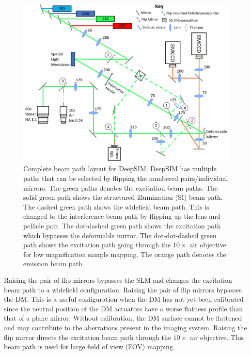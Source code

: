 \begin{figure}[h]
	\centering
	\includegraphics[width=\textwidth]{images/DeepSIM_complete_beam_paths.jpg}
	\caption{Complete beam path layout for DeepSIM. DeepSIM has multiple paths that can be selected by flipping the numbered pairs/individual mirrors. The green paths denotes the excitation beam paths. The solid green path shows the structured illumination (SI) beam path. The dashed green path shows the widefield beam path. This is changed to the interference beam path by flipping up the lens and pellicle pair. The dot-dashed green path shows the excitation path which bypasses the deformable mirror. The dot-dot-dashed green path shows the excitation path going through the $10\times$ air objective for low magnification sample mapping. The orange path denotes the emission beam path.}
	\label{fig:DeepSIM_complete_beam_paths}
\end{figure}

Raising the  pair of flip mirrors bypasses the SLM and changes the excitation beam path to a widefield configuration. Raising the  pair of flip mirrors bypasses the DM. This is a useful configuration when the DM has not yet been calibrated since the neutral position of the DM actuators have a worse flatness profile than that of a plane mirror. Without calibration, the DM surface cannot be flattened and may contribute to the aberrations present in the imaging system. Raising the  flip mirror directs the excitation beam path through the $10 \times$ air objective. This beam path is used for large field of view (FOV) mapping.

